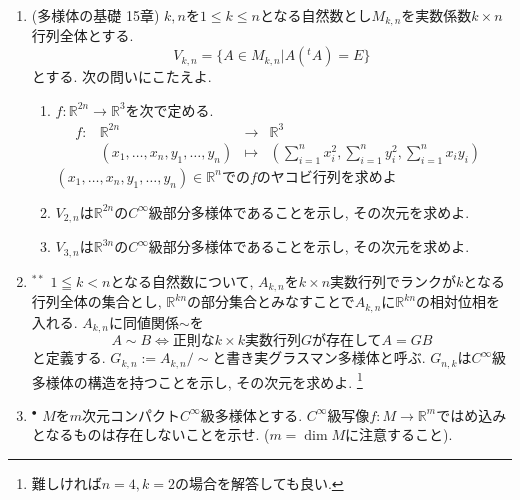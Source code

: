 \documentclass[dvipdfmx,a4paper,11pt]{article}
\newcommand{\R}{\mathbb{R}}
\theoremstyle{definition}
\begin{document}
\begin{enumerate}[label=\textbf{問}\ref*{sec-manifold}.\arabic*]
\item (多様体の基礎 15章) $k,n$を$1 \le k \le n$となる自然数とし$M_{k, n}$を実数係数$k \times n$行列全体とする.
$$
V_{k,n}= \{ A \in M_{k, n}| A ({}^{t}A) = E\}
$$
とする. 次の問いにこたえよ.
	\begin{enumerate}
	     \setlength{\parskip}{0cm}
  \setlength{\itemsep}{0pt} 
	\item $f : \R^{2n} \rightarrow \R^3$を次で定める.
$$
\begin{array}{ccccc}
f: &\R^{2n}& \rightarrow & \R^{3} & \\
&(x_{1}, \ldots, x_n, y_1, \ldots, y_n) & \longmapsto & 
(\sum_{i=1}^{n} x_{i}^{2}, \sum_{i=1}^{n} y_{i}^{2}, \sum_{i=1}^{n} x_{i}y_{i})&
\end{array}
$$
	$(x_{1}, \ldots, x_n, y_1, \ldots, y_n) \in \R^n$での$f$のヤコビ行列を求めよ
	\item $V_{2,n}$は$\R^{2n}$の$C^{\infty}$級部分多様体であることを示し, その次元を求めよ.
	\item$V_{3,n}$は$\R^{3n}$の$C^{\infty}$級部分多様体であることを示し, その次元を求めよ.
	\end{enumerate}


\item$^{**}$ $1 \leqq k < n$となる自然数について, 
$A_{k, n}$を$k \times n$実数行列でランクが$k$となる行列全体の集合とし, $\R^{kn}$の部分集合とみなすことで$A_{k,n}$に$\R^{kn}$の相対位相を入れる. 
$A_{k, n}$に同値関係$\sim$を
$$
	A \sim B \Leftrightarrow \text{正則な$k \times k$実数行列$G$が存在して$A = GB$}
$$
と定義する. $G_{k,n}:= A_{k, n}/\sim$と書き実グラスマン多様体と呼ぶ. $G_{n,k}$は$C^{\infty}$級多様体の構造を持つことを示し, その次元を求めよ. \footnote{難しければ$n=4, k=2$の場合を解答しても良い.}


\item $^\bullet$ $M$を$m$次元コンパクト$C^{\infty}$級多様体とする. $C^{\infty}$級写像$f: M \rightarrow \R^{m}$ではめ込みとなるものは存在しないことを示せ. ($m = \dim M$に注意すること).


\end{enumerate}
\end{document}
